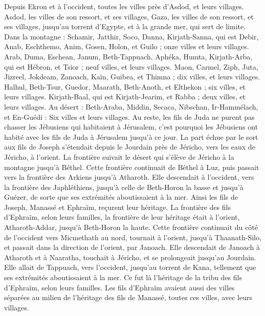 \begin{multicols}{2}
Depuis Ekron et à l’occident, toutes les villes près d’Asdod, et leurs villages.
Asdod, les villes de son ressort, et ses villages, Gaza, les villes de son ressort, et ses villages, jusqu’au torrent d’Egypte, et à la grande mer, qui sert de limite.
Dans la montagne : Schamir, Jatthir, Soco,
Danna, Kirjath-Sanna, qui est Debir,
Anab, Eschthemo, Anim,
Gosen, Holon, et Guilo ; onze villes et leurs villages.
Arab, Duma, Eschean,
Janum, Beth-Tappuach, Aphéka,
Humta, Kirjath-Arba, qui est Hébron, et Tsior ; neuf villes, et leurs villages.
Maon, Carmel, Ziph, Juta,
Jizreel, Jokdeam, Zanoach,
Kaïn, Guibea, et Thimna ; dix villes, et leurs villages.
Halhul, Beth-Tsur, Guedor,
Maarath, Beth-Anoth, et Elthekon ; six villes, et leurs villages.
Kirjath-Baal, qui est Kirjath-Jearim, et Rabba ; deux villes, et leurs villages.
Au désert : Beth-Araba, Middin, Secaca,
Nibschan, Ir-Hammélach, et En-Guédi : Six villes et leurs villages.
Au reste, les fils de Juda ne purent pas chasser les Jébusiens qui habitaient à Jérusalem, c’est pourquoi les Jébusiens ont habité avec les fils de Juda à Jérusalem jusqu’à ce jour.
\VerseOne{}La part échue par le sort aux fils de Joseph s’étendait depuis le Jourdain près de Jéricho, vers les eaux de Jéricho, à l’orient. La frontière suivait le désert qui s’élève de Jéricho à la montagne jusqu’à Béthel.
Cette frontière continuait de Béthel à Luz, puis passait vers la frontière des Arkiens jusqu’à Atharoth.
Elle descendait à l’occident, vers la frontière des Japhléthiens, jusqu’à celle de Beth-Horon la basse et jusqu’à Guézer, de sorte que ses extrémités aboutissaient à la mer.
Ainsi les fils de Joseph, Manassé et Ephraïm, reçurent leur héritage.
La frontière des fils d’Ephraïm, selon leurs familles, la frontière de leur héritage était à l’orient, Atharoth-Addar, jusqu’à Beth-Horon la haute.
Cette frontière continuait du côté de l’occident vers Micmethath au nord, tournait à l’orient, jusqu’à Thaanath-Silo, et passait dans la direction de l’orient, par Janoach.
Elle descendait de Janoach à Atharoth et à Naaratha, touchait à Jéricho, et se prolongeait jusqu’au Jourdain.
Elle allait de Tappuach, vers l’occident, jusqu’au torrent de Kana, tellement que ses extrémités aboutissaient à la mer. Ce fut là l’héritage de la tribu des fils d’Ephraïm, selon leurs familles.
Les fils d’Ephraïm avaient aussi des villes séparées au milieu de l’héritage des fils de Manassé, toutes ces villes, avec leurs villages.

\end{multicols}
